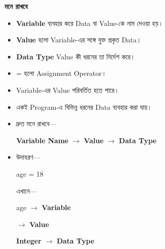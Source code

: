 
\begin{rememberbox}

\textbf{\color{deepOrange}মনে রাখবে}

\begin{itemize}

\item
\textbf{Variable}
ব্যবহার করে Data বা Value-কে নাম দেওয়া হয়।

\item
\textbf{Value}
হলো Variable-এর সঙ্গে যুক্ত প্রকৃত Data।

\item
\textbf{Data Type}
Value কী ধরনের তা নির্দেশ করে।

\item
\textenglish{\ttfamily =}
হলো Assignment Operator।

\item
Variable-এর Value পরিবর্তিত হতে পারে।

\item
একই Program-এ বিভিন্ন ধরনের Data ব্যবহার করা যায়।

\item
দ্রুত মনে রাখবে—

\begin{center}

\textbf{Variable Name}
\(\longrightarrow\)
\textbf{Value}
\(\longrightarrow\)
\textbf{Data Type}

\end{center}

\item
উদাহরণ—

\begin{center}

\textenglish{\ttfamily age = 18}

\end{center}

এখানে—

\begin{center}

\textenglish{\ttfamily age}
\(\longrightarrow\)
\textbf{Variable}

\qquad

\textenglish{}
\(\longrightarrow\)
\textbf{Value}

\qquad

\textbf{Integer}
\(\longrightarrow\)
\textbf{Data Type}

\end{center}

\end{itemize}

\end{rememberbox}

\small


